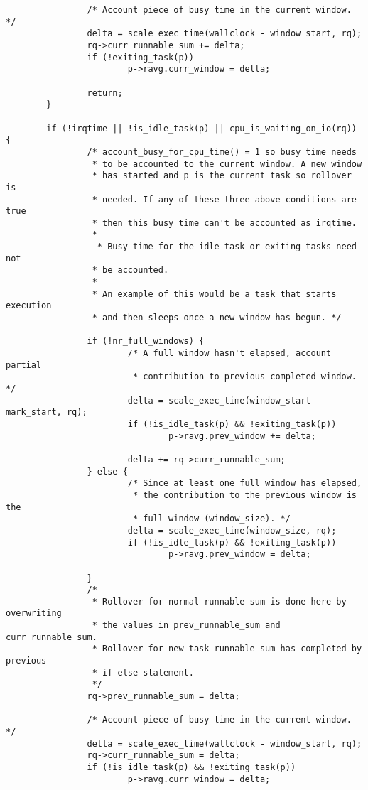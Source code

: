\documentclass{article}
\begin{document}
\begin{verbatim}
                /* Account piece of busy time in the current window. */
                delta = scale_exec_time(wallclock - window_start, rq);
                rq->curr_runnable_sum += delta;
                if (!exiting_task(p))
                        p->ravg.curr_window = delta;

                return;
        }

        if (!irqtime || !is_idle_task(p) || cpu_is_waiting_on_io(rq)) {
                /* account_busy_for_cpu_time() = 1 so busy time needs
                 * to be accounted to the current window. A new window
                 * has started and p is the current task so rollover is
                 * needed. If any of these three above conditions are true
                 * then this busy time can't be accounted as irqtime.
                 *
                  * Busy time for the idle task or exiting tasks need not
                 * be accounted.
                 *
                 * An example of this would be a task that starts execution
                 * and then sleeps once a new window has begun. */

                if (!nr_full_windows) {
                        /* A full window hasn't elapsed, account partial
                         * contribution to previous completed window. */
                        delta = scale_exec_time(window_start - mark_start, rq);
                        if (!is_idle_task(p) && !exiting_task(p))
                                p->ravg.prev_window += delta;
                                
                        delta += rq->curr_runnable_sum;
                } else {
                        /* Since at least one full window has elapsed,
                         * the contribution to the previous window is the
                         * full window (window_size). */
                        delta = scale_exec_time(window_size, rq);
                        if (!is_idle_task(p) && !exiting_task(p))
                                p->ravg.prev_window = delta;

                }
                /*
                 * Rollover for normal runnable sum is done here by overwriting
                 * the values in prev_runnable_sum and curr_runnable_sum.
                 * Rollover for new task runnable sum has completed by previous
                 * if-else statement.
                 */
                rq->prev_runnable_sum = delta;

                /* Account piece of busy time in the current window. */
                delta = scale_exec_time(wallclock - window_start, rq);
                rq->curr_runnable_sum = delta;
                if (!is_idle_task(p) && !exiting_task(p))
                        p->ravg.curr_window = delta;
                        

\end{verbatim}
\end{document}
